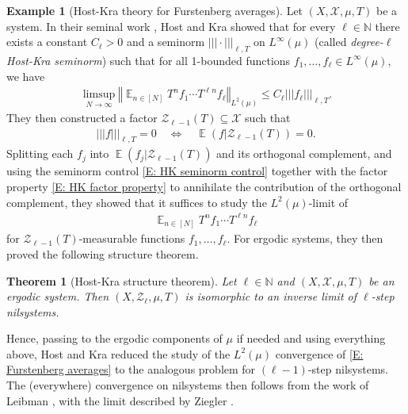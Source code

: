 \documentclass[11pt]{amsart}
\newtheorem{theorem}[lemma]{Theorem}
\theoremstyle{definition}
\newtheorem{example}[lemma]{Example}
\DeclareMathOperator*{\E}{\mathbb{E}}
\newcommand{\N}{{\mathbb N}}
\newcommand{\CX}{{\mathcal X}}
\newcommand{\CZ}{{\mathcal Z}}
\newcommand{\norm}[1]{\left\Vert #1\right\Vert}
\newcommand{\nnorm}[1]{\lvert\!|\!| #1|\!|\!\rvert}
\newcommand{\1}{{\mathbf{1}}}
\begin{document}
\begin{example}[Host-Kra theory for Furstenberg averages]\label{Ex: HK example}
    Let $(X, \CX, \mu, T)$ be a system. In their seminal work \cite{HK05a}, Host and Kra showed that for every $\ell\in\N$ there exists a constant $C_\ell>0$ and a seminorm $\nnorm{\cdot}_{\ell, T}$ on $L^\infty(\mu)$ (called \emph{degree-$\ell$ Host-Kra seminorm}) such that for all 1-bounded functions $f_1, \ldots, f_\ell\in L^\infty(\mu)$, we have
\begin{align}\label{E: HK seminorm control}
\limsup_{N\to\infty}\norm{\E_{n\in[N]} T^n f_1 \cdots T^{\ell n} f_\ell}_{L^2(\mu)} \leq C_\ell \nnorm{f_\ell}_{\ell, T}.
\end{align}
They then constructed a factor $\CZ_{\ell-1}(T)\subseteq \CX$ such that
\begin{align}\label{E: HK factor property}
\nnorm{f}_{\ell, T} = 0 \quad \Longleftrightarrow \quad \E(f|\CZ_{\ell-1}(T)) = 0.
\end{align} 
Splitting each $f_j$ into $\E(f_j|\CZ_{\ell-1}(T))$ and its orthogonal complement, and using the seminorm control \eqref{E: HK seminorm control} together with the factor property \eqref{E: HK factor property} to annihilate the contribution of the orthogonal complement, they showed that it suffices to study the $L^2(\mu)$-limit of 
\begin{align}\label{E: Furstenberg averages}
    \E_{n\in[N]} T^n f_1 \cdots T^{\ell n} f_\ell
\end{align}
for $\CZ_{\ell-1}(T)$-measurable functions $f_1, \ldots, f_\ell$. For ergodic systems, they then proved the following structure theorem.
\begin{theorem}[Host-Kra structure theorem]\label{T: HK structure theorem}
Let $\ell\in \N$ and $(X, \CX, \mu, T)$ be an ergodic system. Then $(X, \CZ_\ell, \mu, T)$ is isomorphic to an inverse limit of $\ell$-step nilsystems.
\end{theorem}
Hence, passing to the ergodic components of $\mu$ if needed and using everything above, Host and Kra reduced the study of the $L^2(\mu)$ convergence of \eqref{E: Furstenberg averages} to the analogous problem for $(\ell-1)$-step nilsystems. The (everywhere) convergence on nilsystems then follows from the work of Leibman \cite{L05b}, with the limit described by Ziegler \cite[Theorem 1.2]{Z05}.
\end{example}
\end{document}
